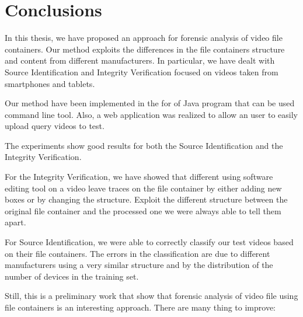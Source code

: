 \chapter*{Conclusions}

In this thesis, we have proposed an approach for forensic analysis of video file containers. Our method exploits the differences in the file containers structure and content from different manufacturers. In particular, we have dealt with Source Identification and Integrity Verification focused on videos taken from smartphones and tablets.

Our method have been implemented in the for of Java program that can be used command line tool. Also, a web application was realized to allow an user to easily upload query videos to test.

The experiments show good results for both the Source Identification and the Integrity Verification.

For the Integrity Verification, we have showed that different using software editing tool on a video leave traces on the file container by either adding new boxes or by changing the structure. Exploit the different structure between the original file container and the processed one we were always able to tell them apart.

For Source Identification, we were able to correctly classify our test videos based on their file containers. The errors in the classification are due to different manufacturers using a very similar structure and by the distribution of the number of devices in the training set.

Still, this is a preliminary work that show that forensic analysis of video file using file containers is an interesting approach. There are many thing to improve:


